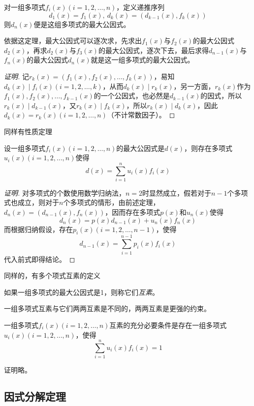 \begin{theorem}
  对一组多项式$f_i(x)(i=1,2,\ldots,n)$，定义递推序列
  \[ d_1(x)=f_1(x), \  d_k(x)=(d_{k-1}(x), f_k(x)) \]
  则$d_n(x)$便是这组多项式的最大公因式。
\end{theorem}

依据这定理，最大公因式可以逐次求，先求出$f_1(x)$与$f_2(x)$的最大公因式$d_2(x)$，再求$d_2(x)$与$f_3(x)$的最大公因式，逐次下去，最后求得$d_{n-1}(x)$与$f_n(x)$的最大公因式$d_n(x)$就是这一组多项式的最大公因式。

\begin{proof}[证明]
  记$r_k(x)=(f_1(x),f_2(x),\ldots,f_k(x))$，易知$d_k(x) \mid f_i(x)(i=1,2,\ldots,k)$，从而$d_k(x) \mid r_k(x)$，另一方面，$r_k(x)$作为$f_1(x),f_2(x),\ldots,f_{k-1}(x)$的一个公因式，也必然是$d_{k-1}(x)$的因式，所以$r_k(x) \mid d_{k-1}(x)$，又$r_k(x) \mid f_k(x)$，所以$r_k(x) \mid d_k(x)$，因此$d_k(x)=r_k(x)(i=1,2,\ldots,n)$（不计常数因子）。
\end{proof}

同样有性质定理
\begin{theorem}
  设一组多项式$f_i(x)(i=1,2,\ldots,n)$的最大公因式是$d(x)$，则存在多项式$u_i(x)(i=1,2,\ldots,n)$使得
  \[ d(x) = \sum_{i=1}^n u_i(x)f_i(x) \]
\end{theorem}

\begin{proof}[证明]
  对多项式的个数使用数学归纳法，$n=2$时显然成立，假若对于$n-1$个多项式也成立，则对于$n$个多项式的情形，由前述定理，$d_n(x)=(d_{n-1}(x), f_n(x))$，因而存在多项式$p(x)$和$u_n(x)$使得
  \[ d_n(x) = p(x)d_{n-1}(x) + u_n(x)f_n(x) \]
  而根据归纳假设，存在$p_i(x)(i=1,2,\ldots,n-1)$，使得
  \[ d_{n-1}(x) = \sum_{i=1}^{n-1}p_i(x)f_i(x) \]
  代入前式即得结论。
\end{proof}

同样的，有多个项式互素的定义
\begin{definition}
  如果一组多项式的最大公因式是1，则称它们\emph{互素}。
\end{definition}

一组多项式互素与它们两两互素是不同的，两两互素是更强的约束。

\begin{theorem}
  一组多项式$f_i(x)(i=1,2,\ldots,n)$互素的充分必要条件是存在一组多项式$u_i(x)(i=1,2,\ldots,n)$，使得
  \[ \sum_{i=1}^n u_i(x)f_i(x) = 1 \]
\end{theorem}
证明略。

\subsection{因式分解定理}
\label{sec:factoring-theorem}

